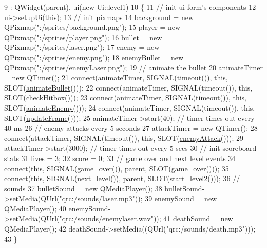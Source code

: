 \begin{DoxyCode}
9                               : QWidget(parent), ui(\textcolor{keyword}{new} Ui::level1)
10 \{
11     \textcolor{comment}{// init ui form's components}
12     ui->setupUi(\textcolor{keyword}{this});
13     \textcolor{comment}{// init pixmaps}
14     background = \textcolor{keyword}{new} QPixmap(\textcolor{stringliteral}{":/sprites/background.png"});
15     player = \textcolor{keyword}{new} QPixmap(\textcolor{stringliteral}{":/sprites/player.png"});
16     bullet = \textcolor{keyword}{new} QPixmap(\textcolor{stringliteral}{":/sprites/laser.png"});
17     enemy = \textcolor{keyword}{new} QPixmap(\textcolor{stringliteral}{":/sprites/enemy.png"});
18     enemyBullet = \textcolor{keyword}{new} QPixmap(\textcolor{stringliteral}{":/sprites/enemyLaser.png"});
19     \textcolor{comment}{// animate the bullet}
20     animateTimer = \textcolor{keyword}{new} QTimer();
21     connect(animateTimer, SIGNAL(timeout()), \textcolor{keyword}{this}, SLOT(\hyperlink{classlevel1_a20a0e78a0ea626784b2efd1addf82238}{animateBullet}()));
22     connect(animateTimer, SIGNAL(timeout()), \textcolor{keyword}{this}, SLOT(\hyperlink{classlevel1_a928d2376d442f285fa1e703a1a7f9104}{checkHitbox}()));
23     connect(animateTimer, SIGNAL(timeout()), \textcolor{keyword}{this}, SLOT(\hyperlink{classlevel1_a76e8519c9cbae81ed94efac17e44565b}{animateEnemy}()));
24     connect(animateTimer, SIGNAL(timeout()), \textcolor{keyword}{this}, SLOT(\hyperlink{classlevel1_a431eac5dfc5286c4173d4ca18bef03ce}{updateFrame}()));
25     animateTimer->start(40); \textcolor{comment}{// timer times out every 40 ms}
26     \textcolor{comment}{// enemy attacks every 5 seconds}
27     attackTimer = \textcolor{keyword}{new} QTimer();
28     connect(attackTimer, SIGNAL(timeout()), \textcolor{keyword}{this}, SLOT(\hyperlink{classlevel1_ace96df0a7bf2be129baa602a47ffc38d}{enemyAttack}()));
29     attackTimer->start(3000); \textcolor{comment}{// timer times out every 5 secs}
30     \textcolor{comment}{// init scoreboard stats}
31     lives = 3;
32     score = 0;
33     \textcolor{comment}{// game over and next level events}
34     connect(\textcolor{keyword}{this}, SIGNAL(\hyperlink{classlevel1_abc87b5eddf6272837ff28cb36d1df0ab}{game\_over}()), parent, SLOT(\hyperlink{classlevel1_abc87b5eddf6272837ff28cb36d1df0ab}{game\_over}()));
35     connect(\textcolor{keyword}{this}, SIGNAL(\hyperlink{classlevel1_aaf762761c96d106b43fe0d331ecee122}{next\_level}()), parent, SLOT(start\_level2()));
36     \textcolor{comment}{// sounds}
37     bulletSound = \textcolor{keyword}{new} QMediaPlayer();
38     bulletSound->setMedia(QUrl(\textcolor{stringliteral}{"qrc:/sounds/laser.mp3"}));
39     enemySound = \textcolor{keyword}{new} QMediaPlayer();
40     enemySound->setMedia(QUrl(\textcolor{stringliteral}{"qrc:/sounds/enemylaser.wav"}));
41     deathSound = \textcolor{keyword}{new} QMediaPlayer();
42     deathSound->setMedia((QUrl(\textcolor{stringliteral}{"qrc:/sounds/death.mp3"})));
43 \}
\end{DoxyCode}


